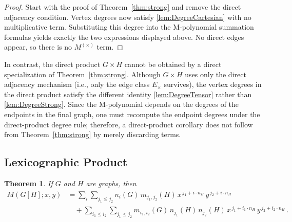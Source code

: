 \documentclass[letterpaper,12pt]{article}
\newtheorem{theorem}{Theorem}[section]
\begin{document}
\begin{proof}
Start with the proof of Theorem~\ref{thm:strong} and remove the direct adjacency condition. 
Vertex degrees now satisfy \eqref{lem:DegreeCartesian} with no multiplicative term.  
Substituting this degree into the M-polynomial summation formulas yields exactly the two
expressions displayed above. No direct edges appear, so there is no $M^{(\times)}$ term.  
\end{proof}

In contrast, the direct product $G\times H$ cannot be obtained by
a direct specialization of Theorem~\ref{thm:strong}.  Although $G\times H$
uses only the direct adjacency mechanism (i.e., only the edge class
$E_\times$ survives), the vertex degrees in the direct product satisfy the
different identity \eqref{lem:DegreeTensor} rather than  \eqref{lem:DegreeStrong}.
Since the M-polynomial depends on the degrees of the endpoints in the
final graph, one must recompute the endpoint degrees under the
direct-product degree rule; therefore, a direct-product corollary does not
follow from Theorem~\ref{thm:strong} by merely discarding terms.
 





\subsection{Lexicographic Product}
 \label{sec:Lexicographic}

\begin{theorem}
\label{thm:lexico}
If $G$ and $H$ are graphs, then 
\begin{equation}
    \begin{aligned}
M(G[H];x,y)
&=
\sum_{i}\sum_{j_1\le j_2}
n_i(G)\, m_{j_1,j_2}(H)\,
x^{\,j_1 + i \cdot n_H}\,
y^{\,j_2 + i \cdot n_H}  \\
&\quad+
\sum_{i_1\le i_2}\sum_{j_1 \leq j_2}
m_{i_1,i_2}(G)\, n_{j_1}(H)\, n_{j_2}(H)\,
x^{\,j_1 + i_1 \cdot n_H}\,
y^{\,j_2 + i_2 \cdot n_H}\,.
\end{aligned}
\end{equation}
\end{theorem}
\end{document}
